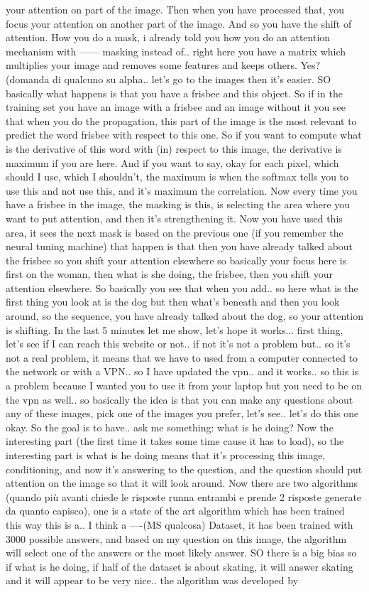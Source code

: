 your attention on part of the image. Then when you have processed that, you focus your attention on another part of the image. And so you have the shift of attention. How you do a mask, i already told you how you do an attention mechanism with —— masking instead of.. right here you have a matrix which multiplies your image and removes some features and keeps others. Yes? (domanda di qualcuno su alpha.. let’s go to the images then it’s easier. SO basically what happens is that you have a frisbee and this object. So if in the training set you have an image with a frisbee and an image without it you see that when you do the propagation, this part of the image is the most relevant to predict the word frisbee with respect to this one. So if you want to compute what is the derivative of this word with (in) respect to this image, the derivative is maximum if you are here. And if you want to say, okay for each pixel, which should I use, which I shouldn’t, the maximum is when the softmax tells you to use this and not use this, and it’s maximum the correlation. Now every time you have a frisbee in the image, the masking is this, is selecting the area where you want to put attention, and then it’s strengthening it. Now you have used this area, it sees the next mask is based on the previous one (if you remember the neural tuning machine) that happen is that then you have already talked about the frisbee so you shift your attention elsewhere so basically your focus here is first on the woman, then what is she doing, the frisbee, then you shift your attention elsewhere. So basically you see that when you add.. so here what is the first thing you look at is the dog but then what’s beneath and then you look around, so the sequence, you have already talked about the dog, so your attention is shifting. In the last 5 minutes let me show, let’s hope it works... first thing, let’s see if I can reach this website or not.. if not it’s not a problem but.. so it’s not a real problem, it means that we have to used from a computer connected to the network or with a VPN.. so I have updated the vpn.. and it works.. so this is a problem because I wanted you to use it from your laptop but you need to be on the vpn as well.. so basically the idea is that you can make any questions about any of these images, pick one of the images you prefer, let’s see.. let’s do this one okay. So the goal is to have.. ask me something: what is he doing? Now the interesting part (the first time it takes some time cause it has to load), so the interesting part is what is he doing means that it’s processing this image, conditioning, and now it’s answering to the question, and the question should put attention on the image so that it will look around. Now there are two algorithms (quando più avanti chiede le risposte runna entrambi e prende 2 risposte generate da quanto capisco), one is a state of the art algorithm which has been trained this way this is a.. I think a —-(MS qualcosa) Dataset, it has been trained with 3000 possible answers, and based on my question on this image, the algorithm will select one of the answers or the most likely answer. SO there is a big bias so if what is he doing, if half of the dataset is about skating, it will answer skating and it will appear to be very nice.. the algorithm was developed by 